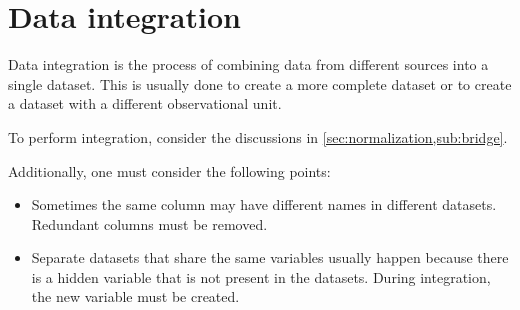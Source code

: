 
\section{Data integration}

Data integration is the process of combining data from different sources into a single
dataset.  This is usually done to create a more complete dataset or to create a dataset
with a different observational unit.

To perform integration, consider the discussions in \cref{sec:normalization,sub:bridge}.

Additionally, one must consider the following points:
\begin{itemize}
  \item Sometimes the same column may have different names in different datasets.  Redundant
    columns must be removed.
  \item Separate datasets that share the same variables usually happen because there is a
    hidden variable that is not present in the datasets.  During integration, the new
    variable must be created.
\end{itemize}

